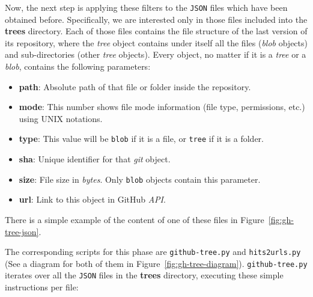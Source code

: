 \documentclass[a4paper, 12pt]{book}
\begin{document}
Now, the next step is applying these filters to the \texttt{JSON} files which have been obtained before.
Specifically, we are interested only in those files included into the \textbf{trees} directory.
Each of those files contains the file structure of the last version of its repository,
where the \textit{tree} object contains under itself all the files (\textit{blob} objects) and sub-directories
(other \textit{tree} objects). Every object, no matter if it is a \textit{tree} or a \textit{blob}, contains the following parameters:
\begin{itemize}
  \item \textbf{path}: Absolute path of that file or folder inside the repository.
  \item \textbf{mode}: This number shows file mode information (file type, permissions, etc.) using UNIX notations.
  \item \textbf{type}: This value will be \texttt{blob} if it is a file, or \texttt{tree} if it is a folder.
  \item \textbf{sha}: Unique identifier for that \emph{git} object.
  \item \textbf{size}: File size in \textit{bytes}. Only \texttt{blob} objects contain this parameter.
  \item \textbf{url}: Link to this object in GitHub \textit{API}.
\end{itemize}

There is a simple example of the content of one of these files in Figure~\ref{fig:gh-tree-json}.

The corresponding scripts for this phase are \texttt{github-tree.py} and \texttt{hits2urls.py}
(See a diagram for both of them in Figure~\ref{fig:gh-tree-diagram}).
\texttt{github-tree.py} iterates over all the \texttt{JSON} files in the \textbf{trees} directory,
executing these simple instructions per file:
\end{document}
